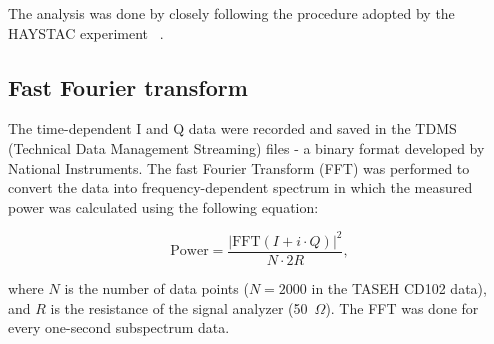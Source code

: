     The analysis was done by closely following the procedure adopted by the 
HAYSTAC experiment ~\cite{HAYSTACII}.

\subsection{Fast Fourier transform}
The time-dependent I and Q data were recorded and saved in the TDMS 
(Technical Data Management Streaming) files - a 
binary format developed by National Instruments.
The fast Fourier Transform (FFT) was performed to convert the data into 
frequency-dependent spectrum in which the measured power was calculated 
using the following equation:

\begin{equation}
\label{eq:4.1}
    \text{Power} = \frac{|\text{FFT}(I+i \cdot Q)|^{2}}{N \cdot 2R},
\end{equation}

where $N$ is the number of data points ($N  = 2000$ in the TASEH 
CD102 data), and $R$ is the resistance of the signal analyzer (50~$\Omega$).
The FFT was done for every one-second subspectrum data.


